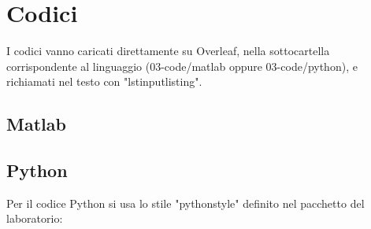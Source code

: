 \chapter{Codici}
\label{appendiceA}

I codici vanno caricati direttamente su Overleaf, nella sottocartella corrispondente al linguaggio (03-code/matlab oppure 03-code/python), e richiamati nel testo con "lstinputlisting".

\section{Matlab}


\section{Python}
Per il codice Python si usa lo stile "pythonstyle" definito nel pacchetto del laboratorio:

